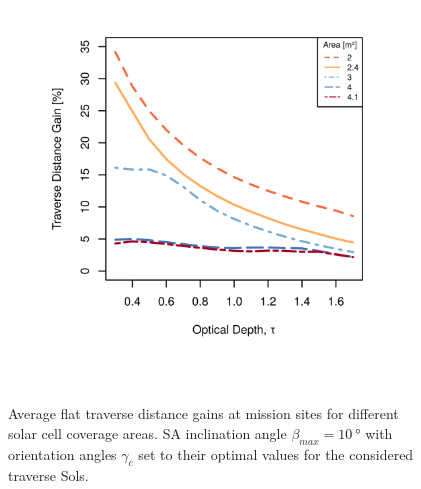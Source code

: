 \begin{figure}[h]
\begin{subfigure}[t]{\subfigureWidth}
        \includegraphics[height=\graphicsHeight]{sections/power-system-design/solar-array/plots/ismeniuscavus-75w-traverse-gains-for-different-solar-cell-coverage-areas.png}
		\label{fig:plot:sub:iani-chaos-flat-traverse-gains-for-different-sa-area}
	\end{subfigure}\\[0.8ex]
    \caption[Average flat traverse distance gains at mission sites for different solar cell coverage areas]
            {Average flat traverse distance gains at mission sites for different solar cell coverage areas. \ac{SA} inclination angle $\beta_{max} = \SI{10}{\degree}$ with orientation angles $\gamma_{c}$ set to their optimal values for the considered traverse Sols.}
    \label{fig:plot:flat-traverse-gains-for-different-sa-area}
\vspace{-2ex}
\end{figure}


